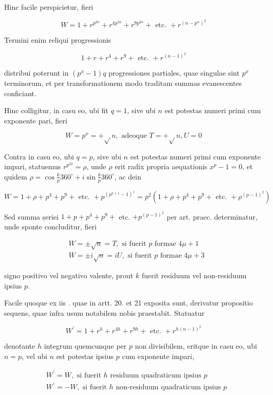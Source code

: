 \documentclass[10pt]{article}
\begin{document}
Hinc facile perspicietur, fieri

\[
W=1+r^{p^{2 \alpha}}+r^{4 p^{2 \alpha}}+r^{9 p^{2 \alpha}}+\text { etc. }+r^{\left(n-p^{\alpha}\right)^{2}}
\]

Termini enim reliqui progressionis

\[
1+r+r^{4}+r^{9}+\text { etc. }+r^{(n-1)^{2}}
\]

distribui poterunt in \(\left(p^{x}-1\right) q\) progressiones partiales, quae singulae sint \(p^{x}\) terminorum, et per transformationem modo traditam summas evanescentes conficiant.

Hinc colligitur, in casu eo, ubi fit \(q=1\), sive ubi \(n\) est potestas numeri primi cum exponente pari, fieri

\[
W=p^{x}=+\sqrt{ } n, \text { adeoque } T=+\sqrt{ } n, U=0
\]

Contra in casu eo, ubi \(q=p\), sive ubi \(n\) est potestas numeri primi cum exponente impari, statuemus \(r^{p^{22}}=\rho\), unde \(\rho\) erit radix propria aequationis \(x^{p}-1=0\), et quidem \(\rho=\cos \frac{k}{p} 360^{\circ}+i \sin \frac{k}{p} 360^{\circ}\), ac dein

\[
W=1+\rho+p^{4}+p^{9}+\text { etc. }+p^{\left(p^{2+1}-1\right)^{z}}=p^{2}\left(1+\rho+p^{4}+p^{9}+\text { etc. }+\rho^{(p-1)^{2}}\right)
\]

Sed summa șeriei \(1+p+p^{4}+p^{9}+\) etc. \(+p^{(p-1)^{2}}\) per art. praec. determinatur, unde sponte concluditur, fieri

\[
\begin{aligned}
& W= \pm \sqrt{n}=T, \text { si fuerit } p \text { formae } 4 \mu+1 \\
& W= \pm i \sqrt{n}=i U, \text { si fuerit } p \text { formae } 4 \mu+3
\end{aligned}
\]

signo positivo vel negativo valente, prout \(k\) fuerit residuum vel non-residuum ipsius \(p\).

Facile quoque ex iis . quae in artt. 20. et 21 exposita sunt, derivatur propositio sequens, quae infra usum notabilem nobis praestabit. Statuatur

\[
W^{\prime}=1+r^{h}+r^{4 h}+r^{9 h}+\text { etc. }+r^{h(n-1)^{2}}
\]

denotante \(h\) integrum quemcunque per \(p\) non divisibilem, eritque in casu eo, ubi \(n=p\), vel ubi \(n\) est potestas ipsius \(p\) cum exponente impari,

\[
\begin{aligned}
& W^{\prime}=W, \text { si fuerit } h \text { residuum quadraticum ipsius } p \\
& W^{\prime}=-W, \text { si fuerit } h \text { non-residuum quadraticum ipsius } p
\end{aligned}
\]
\end{document}
